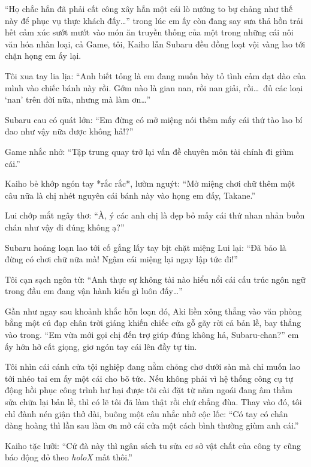 \documentclass[../main.tex]{subfiles}
\begin{document}
``Họ chắc hẳn đã phải cất công xây hẳn một cái lò nướng to bự chảng như thế này để phục vụ thực khách đấy\dots'' trong lúc em ấy còn đang say sưa thả hồn trải hết cảm xúc sướt mướt vào món ăn truyền thống của một trong những cái nôi văn hóa nhân loại, cả Game, tôi, Kaiho lẫn Subaru đều đồng loạt vội vàng lao tới chặn họng em ấy lại.

Tôi xua tay lia lịa: ``Anh biết tỏng là em đang muốn bày tỏ tình cảm dạt dào của mình vào chiếc bánh này rồi. Gớm nào là gian nan, rồi nan giải, rồi\dots\ đủ các loại `nan' trên đời nữa, nhưng mà làm ơn\dots''

Subaru cau có quát lớn: ``Em đừng có mở miệng nói thêm mấy cái thứ tào lao bí đao như vậy nữa được không hả!?''

Game nhắc nhở: ``Tập trung quay trở lại vấn đề chuyên môn tài chính đi giùm cái.''

Kaiho bẻ khớp ngón tay *rắc rắc*, lườm nguýt: ``Mở miệng chơi chữ thêm một câu nữa là chị nhét nguyên cái bánh này vào họng em đấy, Takane.''

Lui chớp mắt ngây thơ: ``À, ý các anh chị là dẹp bỏ mấy cái thứ nhan nhản buồn chán như vậy đi đúng không ạ?''

Subaru hoảng loạn lao tới cố gắng lấy tay bịt chặt miệng Lui lại: ``Đã bảo là đừng có chơi chữ nữa mà! Ngậm cái miệng lại ngay lập tức đi!''

Tôi cạn sạch ngôn từ: ``Anh thực sự không tài nào hiểu nổi cái cấu trúc ngôn ngữ trong đầu em đang vận hành kiểu gì luôn đấy\dots''

Gần như ngay sau khoảnh khắc hỗn loạn đó, Aki liền xông thẳng vào văn phòng bằng một cú đạp chân trời giáng khiến chiếc cửa gỗ gãy rời cả bản lề, bay thẳng vào trong. ``Em vừa mới gọi chị đến trợ giúp đúng không hả, Subaru-chan?'' em ấy hớn hở cất giọng, giơ ngón tay cái lên đầy tự tin.


Tôi nhìn cái cánh cửa tội nghiệp đang nằm chỏng chơ dưới sàn mà chỉ muốn lao tới nhéo tai em ấy một cái cho bõ tức. Nếu không phải vì hệ thống công cụ tự động hồi phục công trình hư hại được tôi cài đặt từ năm ngoái đang âm thầm sửa chữa lại bản lề, thì có lẽ tôi đã làm thật rồi chứ chẳng đùa. Thay vào đó, tôi chỉ đành nén giận thở dài, buông một câu nhắc nhở cộc lốc: ``Có tay có chân đàng hoàng thì lần sau làm ơn mở cái cửa một cách bình thường giùm anh cái.''

Kaiho tặc lưỡi: ``Cứ đà này thì ngân sách tu sửa cơ sở vật chất của công ty cũng báo động đỏ theo \textit{holoX} mất thôi.''
\end{document}
